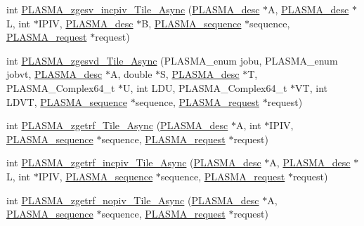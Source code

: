 \begin{DoxyCompactItemize}
\item 
int \hyperlink{group__PLASMA__Complex64__t__Tile__Async_ga249ca8742ffa280cbd62c4bdad362ee7_ga249ca8742ffa280cbd62c4bdad362ee7}{P\+L\+A\+S\+M\+A\+\_\+zgesv\+\_\+incpiv\+\_\+\+Tile\+\_\+\+Async} (\hyperlink{structplasma__desc__t}{P\+L\+A\+S\+M\+A\+\_\+desc} $\ast$A, \hyperlink{structplasma__desc__t}{P\+L\+A\+S\+M\+A\+\_\+desc} $\ast$L, int $\ast$I\+P\+I\+V, \hyperlink{structplasma__desc__t}{P\+L\+A\+S\+M\+A\+\_\+desc} $\ast$B, \hyperlink{structplasma__sequence__t}{P\+L\+A\+S\+M\+A\+\_\+sequence} $\ast$sequence, \hyperlink{structplasma__request__t}{P\+L\+A\+S\+M\+A\+\_\+request} $\ast$request)
\item 
int \hyperlink{group__PLASMA__Complex64__t__Tile__Async_gae57b09ad721b00e28e688e3510f2d910_gae57b09ad721b00e28e688e3510f2d910}{P\+L\+A\+S\+M\+A\+\_\+zgesvd\+\_\+\+Tile\+\_\+\+Async} (P\+L\+A\+S\+M\+A\+\_\+enum jobu, P\+L\+A\+S\+M\+A\+\_\+enum jobvt, \hyperlink{structplasma__desc__t}{P\+L\+A\+S\+M\+A\+\_\+desc} $\ast$A, double $\ast$S, \hyperlink{structplasma__desc__t}{P\+L\+A\+S\+M\+A\+\_\+desc} $\ast$T, P\+L\+A\+S\+M\+A\+\_\+\+Complex64\+\_\+t $\ast$U, int L\+D\+U, P\+L\+A\+S\+M\+A\+\_\+\+Complex64\+\_\+t $\ast$V\+T, int L\+D\+V\+T, \hyperlink{structplasma__sequence__t}{P\+L\+A\+S\+M\+A\+\_\+sequence} $\ast$sequence, \hyperlink{structplasma__request__t}{P\+L\+A\+S\+M\+A\+\_\+request} $\ast$request)
\item 
int \hyperlink{group__PLASMA__Complex64__t__Tile__Async_ga8005f834cea1750e617b078d2cfa39d2_ga8005f834cea1750e617b078d2cfa39d2}{P\+L\+A\+S\+M\+A\+\_\+zgetrf\+\_\+\+Tile\+\_\+\+Async} (\hyperlink{structplasma__desc__t}{P\+L\+A\+S\+M\+A\+\_\+desc} $\ast$A, int $\ast$I\+P\+I\+V, \hyperlink{structplasma__sequence__t}{P\+L\+A\+S\+M\+A\+\_\+sequence} $\ast$sequence, \hyperlink{structplasma__request__t}{P\+L\+A\+S\+M\+A\+\_\+request} $\ast$request)
\item 
int \hyperlink{group__PLASMA__Complex64__t__Tile__Async_gaa9d5a18c3cd7ddfb551cfcffe7d90f2d_gaa9d5a18c3cd7ddfb551cfcffe7d90f2d}{P\+L\+A\+S\+M\+A\+\_\+zgetrf\+\_\+incpiv\+\_\+\+Tile\+\_\+\+Async} (\hyperlink{structplasma__desc__t}{P\+L\+A\+S\+M\+A\+\_\+desc} $\ast$A, \hyperlink{structplasma__desc__t}{P\+L\+A\+S\+M\+A\+\_\+desc} $\ast$L, int $\ast$I\+P\+I\+V, \hyperlink{structplasma__sequence__t}{P\+L\+A\+S\+M\+A\+\_\+sequence} $\ast$sequence, \hyperlink{structplasma__request__t}{P\+L\+A\+S\+M\+A\+\_\+request} $\ast$request)
\item 
int \hyperlink{group__PLASMA__Complex64__t__Tile__Async_gae0d785e8c60e02a21697f60cd1cef5fc_gae0d785e8c60e02a21697f60cd1cef5fc}{P\+L\+A\+S\+M\+A\+\_\+zgetrf\+\_\+nopiv\+\_\+\+Tile\+\_\+\+Async} (\hyperlink{structplasma__desc__t}{P\+L\+A\+S\+M\+A\+\_\+desc} $\ast$A, \hyperlink{structplasma__sequence__t}{P\+L\+A\+S\+M\+A\+\_\+sequence} $\ast$sequence, \hyperlink{structplasma__request__t}{P\+L\+A\+S\+M\+A\+\_\+request} $\ast$request)

\end{DoxyCompactItemize}
